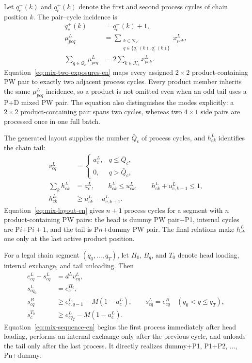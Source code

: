 \documentclass[final,5p,times,twocolumn]{elsarticle}
\begin{document}
Let $q_c^-(k)$ and $q_c^+(k)$ denote the first and second process cycles of chain position $k$. The pair--cycle incidence is
\begin{equation}
\begin{aligned}
q_c^+(k)&=q_c^-(k)+1,\\
\mu^L_{pcq}
&=\sum_{\substack{k\in\mathcal K_c:\\q\in\{q_c^-(k),q_c^+(k)\}}}x^L_{pck},\\
\sum_{q\in\mathcal Q_c}\mu^L_{pcq}
&=2\sum_{k\in\mathcal K_c}x^L_{pck}.
\end{aligned}
\label{eq:mix-two-exposures-en}
\end{equation}
Equation~\eqref{eq:mix-two-exposures-en} maps every assigned $2\times2$ product-containing PW pair to exactly two adjacent process cycles. Every product member inherits the same $\mu^L_{pcq}$ incidence, so a product is not omitted even when an odd tail uses a P+D mixed PW pair. The equation also distinguishes the modes explicitly: a $2\times2$ product-containing pair spans two cycles, whereas two $4\times1$ side pairs are processed once in one full batch.

The generated layout supplies the number $\bar Q_c$ of process cycles, and $h^L_{ck}$ identifies the chain tail:
\begin{equation}
\begin{aligned}
v^L_{cq}&=
\begin{cases}a^L_c,&q\le\bar Q_c,\\0,&q>\bar Q_c,
\end{cases}\\
\sum_k h^L_{ck}&=a^L_c,\qquad
h^L_{ck}\le u^L_{ck},\qquad
h^L_{ck}+u^L_{c,k+1}\le1,\\
h^L_{ck}&\ge u^L_{ck}-u^L_{c,k+1}.
\end{aligned}
\label{eq:mix-layout-en}
\end{equation}
Equation~\eqref{eq:mix-layout-en} gives $n+1$ process cycles for a segment with $n$ product-containing PW pairs: the head is dummy PW pair+P1, internal cycles are P$i$+P$i+1$, and the tail is P$n$+dummy PW pair. The final relations make $h^L_{ck}$ one only at the last active product position.

For a legal chain segment $(q_0,\ldots,q_T)$, let $H_0$, $B_q$, and $T_0$ denote head loading, internal exchange, and tail unloading. Then
\begin{equation}
\begin{aligned}
e^L_{cq}-s^L_{cq}&=d^L v^L_{cq},\\
s^L_{cq_0}&=e^{H_0}_c,\\
s^{B}_{cq}&\ge e^L_{c,q-1}-M(1-a^L_c),\qquad
s^L_{cq}=e^{B}_{cq}\quad(q_0<q\le q_T),\\
s^{T_0}_c&\ge e^L_{cq_T}-M(1-a^L_c).
\end{aligned}
\label{eq:mix-sequence-en}
\end{equation}
Equation~\eqref{eq:mix-sequence-en} begins the first process immediately after head loading, performs an internal exchange only after the previous cycle, and unloads the tail only after the last process. It directly realizes dummy+P1, P1+P2, $\ldots$, Pn+dummy.
\end{document}
